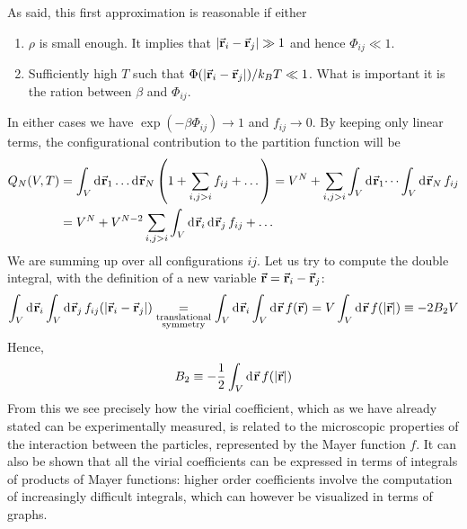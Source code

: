 \documentclass[../../Main/Main.tex]{subfiles}
\begin{document}
As said, this first approximation is reasonable if either
\begin{enumerate}
\item \( \rho  \) is small enough. It implies that \( \abs{\va{r}_i - \va{r}_j} \gg 1 \) and hence \( \Phi _{ij} \ll 1 \).
\item Sufficiently high \( T \) such that \( \Phi (\abs{\va{r}_i - \va{r}_j} )/k_B T \ll 1 \). What is important it is the ration between \( \beta  \)  and \( \Phi _{ij} \).
\end{enumerate}
In either cases we have \( \exp (- \beta \Phi _{ij}) \rightarrow 1 \) and \( f_{ij} \rightarrow 0 \). By keeping only linear terms,  the configurational contribution to the partition function will be
\begin{equation*}
\begin{split}
  Q_N (V,T) &= \int_{V}^{} \dd[]{\va{r}_1} \dots \dd[]{\va{r}_N} \qty(1+ \sum_{i,j>i}^{} f_{ij} + \dots )
  = V^N + \sum_{i,j>i}^{} \int_{V}^{} \dd[]{\va{r}_1} \dots \int_{V}^{}  \dd[]{\va{r}_N} f_{ij} \\
  &= V^N + V^{N-2} \sum_{i,j>i}^{} \int_{V}^{} \dd[]{\va{r}_i} \dd[]{\va{r}_j} f_{ij} + \dots \\
\end{split}
\end{equation*}
We are summing up over all configurations \( ij \). Let us try to compute the double integral, with the definition of a new variable \( \va{r} = \va{r}_i - \va{r}_j \):
\begin{equation*}
  \int_{V}^{} \dd[]{\va{r}_i} \int_{V}^{} \dd[]{\va{r}_j} f_{ij} (\abs{\va{r}_i - \va{r}_j} ) \underset{\substack{ \text{translational} \\  \text{symmetry} } }{=}  \int_{V}^{} \dd[]{\va{r}_i} \int_{V}^{}  \dd[]{\va{r}} f (\va{r})
  = V \int_{V}^{} \dd[]{\va{r}}  f \qty(\abs{\va{r}} ) \equiv -2 B_2 V
\end{equation*}
Hence,
\begin{equation}
  B_2 \equiv - \frac{1}{2} \int_{V}^{} \dd[]{\va{r}}  f \qty(\abs{\va{r}} )
\end{equation}
From this we see precisely how the virial coefficient, which as we have already stated can be experimentally measured, is related to the microscopic properties of the interaction between the particles, represented by the Mayer function \( f \). It can also be shown that all the virial coefficients can be expressed in terms of integrals of products of Mayer functions: higher order coefficients involve the computation of increasingly difficult integrals, which can however be visualized in terms of graphs.
\end{document}
